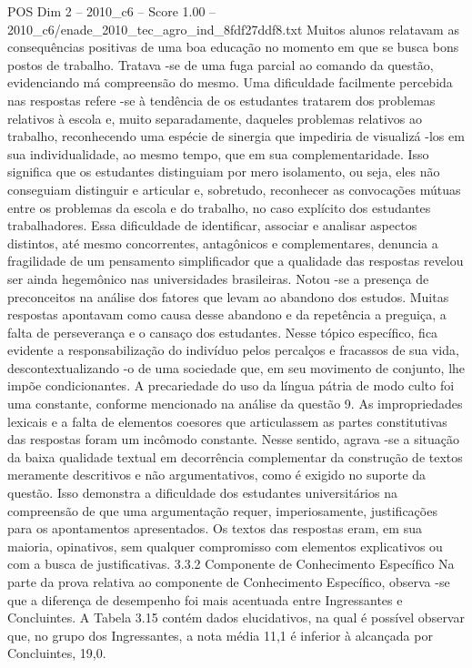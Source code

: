 \begin{textsample}{POS Dim 2 – 2010\_c6 – Score 1.00 – 2010\_c6/enade\_2010\_tec\_agro\_ind\_8fdf27ddf8.txt}
Muitos alunos relatavam as consequências positivas de uma boa educação no momento em que se busca bons postos de trabalho.
Tratava -se de uma fuga parcial ao comando da questão, evidenciando má compreensão do mesmo.
Uma dificuldade facilmente percebida nas respostas refere -se à tendência de os estudantes tratarem dos problemas relativos à escola e, muito separadamente, daqueles problemas relativos ao trabalho, reconhecendo uma espécie de sinergia que impediria de visualizá -los em sua individualidade, ao mesmo tempo, que em sua complementaridade.
Isso significa que os estudantes distinguiam por mero isolamento, ou seja, eles não conseguiam distinguir e articular e, sobretudo, reconhecer as convocações mútuas entre os problemas da escola e do trabalho, no caso explícito dos estudantes trabalhadores.
Essa dificuldade de identificar, associar e analisar aspectos distintos, até mesmo concorrentes, antagônicos e complementares, denuncia a fragilidade de um pensamento simplificador que a qualidade das respostas revelou ser ainda hegemônico nas universidades brasileiras.
Notou -se a presença de preconceitos na análise dos fatores que levam ao abandono dos estudos.
Muitas respostas apontavam como causa desse abandono e da repetência a preguiça, a falta de perseverança e o cansaço dos estudantes.
Nesse tópico específico, fica evidente a responsabilização do indivíduo pelos percalços e fracassos de sua vida, descontextualizando -o de uma sociedade que, em seu movimento de conjunto, lhe impõe condicionantes.
A precariedade do uso da língua pátria de modo culto foi uma constante, conforme mencionado na análise da questão 9.
As impropriedades lexicais e a falta de elementos coesores que articulassem as partes constitutivas das respostas foram um incômodo constante.
Nesse sentido, agrava -se a situação da baixa qualidade textual em decorrência complementar da construção de textos meramente descritivos e não argumentativos, como é exigido no suporte da questão.
Isso demonstra a dificuldade dos estudantes universitários na compreensão de que uma argumentação requer, imperiosamente, justificações para os apontamentos apresentados.
Os textos das respostas eram, em sua maioria, opinativos, sem qualquer compromisso com elementos explicativos ou com a busca de justificativas. 3.3.2 Componente de Conhecimento Específico Na parte da prova relativa ao componente de Conhecimento Específico, observa -se que a diferença de desempenho foi mais acentuada entre Ingressantes e Concluintes.
A Tabela 3.15 contém dados elucidativos, na qual é possível observar que, no grupo dos Ingressantes, a nota média 11,1 é inferior à alcançada por Concluintes, 19,0.

\end{textsample}
